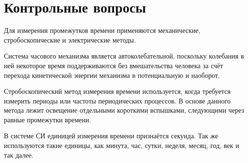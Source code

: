 \section{Контрольные вопросы}

\begin{Enumerate}
	\item Для измерения промежутков времени применяются механические, стробоскопические и электрические методы.
	
	\item Система часового механизма является автоколебательной, поскольку колебания в ней некоторое время поддерживаются без вмешательства человека за счёт перехода кинетической энергии механизма в потенциальную и наоборот.
	
	\item Стробоскопический метод измерения времени используется, когда требуется измерить периоды или частоты периодических процессов. В основе данного метода лежит освещение отдельными короткими вспышками, следующими через равные промежутки времени.
	
	\item В системе СИ единицей измерения времени признаётся секунда. Так же используются такие единицы, как минута, час, сутки, неделя, месяц, год, век и так далее.
\end{Enumerate}